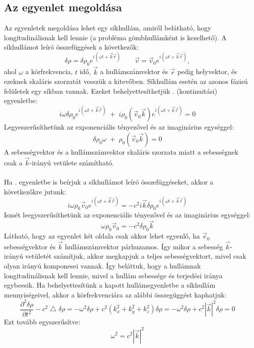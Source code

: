\documentclass[a4paper, titlepage]{article}
\begin{document}
\subsection*{Az egyenlet megoldása}
Az egyenletek megoldása lehet egy síkhullám, amiről belátható, hogy longitudinálisnak kell lennie (a probléma gömbhullámként is kezelhető). A síkhullámot leíró összefüggések a következők:
\begin{equation}
\label{eq:long}
\delta\rho=\delta\rho_0 e^{i(\omega t+\vec{k}\vec{r})}\qquad \vec{v}=\vec{v}_0e^{i(\omega t+\vec{k}\vec{r})},
\end{equation}
ahol $\omega$ a körfrekvencia, $t$ idő, $\vec{k}$ a hullámszámvektor és $\vec{r}$ pedig helyvektor, és ezeknek skaláris szorzatát vesszük a kitevőben. Síkhullám esetén az azonos fázisú felületek egy síkban vannak. Ezeket behelyettesíthetjük . (kontinuitási) egyenletbe:
$$
i\omega\delta\rho_0 e^{i(\omega t+\vec{k}\vec{r})}\;+\;i\rho_0(\vec{v}_0\vec{k})e^{i(\omega t+\vec{k}\vec{r})}=0
$$
Legyeszerűsíthetünk az exponenciális tényezővel és az imaginárius egységgel:
$$
\delta \rho_0\omega\;+\;\rho_0(\vec{v}_0\vec{k})=0
$$
A sebességvektor és a hullámszámvektor skaláris szorzata miatt a sebességnek csak a $\vec{k}$-irányú vetülete számítható.\\\\
Ha . egyenletbe is beírjuk a síkhullámot leíró összefüggéseket, akkor a következőkre jutunk:
$$
i\omega\rho_0 \vec{v}_0 e^{i(\omega t+\vec{k}\vec{r})}=-c^2i\vec{k}\delta\rho_0 e^{i(\omega t+\vec{k}\vec{r})}
$$
Ismét leegyszerűsíthetünk az exponenciális tényezővel és az imaginárius egységgel:
$$
\omega \rho_0 \vec{v}_0=-c^2\delta \rho_0 \vec{k}
$$
Látható, hogy az egyenlet két oldala csak akkor lehet egyenlő, ha $\vec{v}_0$ sebességvektor és $\vec{k}$ hullámszámvektor párhuzamos. Így mikor a sebesség $\vec{k}$-irányú vetületét számítjuk, akkor megkapjuk a teljes sebességvektort, mivel csak olyan irányú komponesei vannak. Így beláttuk, hogy a hullámnak longitudinálisnak kell lennie, mivel a hullám sebessége és terjedési iránya egybeesik.\newpage
\noindent Ha behelyettesítünk a kapott hullámegyenletbe a síkhullám mennyiségeivel, akkor a körfrekvenciára az alábbi összegüggést kaphatjuk:
$$
\frac{\partial^2\delta \rho}{\partial t^2}-c^2\bigtriangleup \delta \rho=-\omega^2\delta\rho+c^2(k_x^2+k_y^2+k_z^2)\delta\rho=-\omega^2\delta\rho+c^2|\vec{k}|^2\delta\rho=0
$$
Ezt tovább egyszerűsítve:
$$
\omega^2=c^2|\vec{k}|^2
$$
\end{document}
